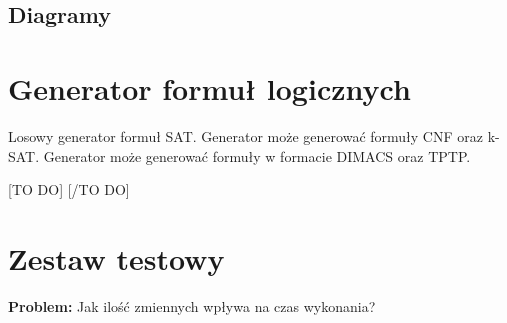 \documentclass[a4paper,12pt]{article}
\begin{document}
\begin{itemize}
\subsection{Diagramy}
%
%
%
%
%


\section{Generator formuł logicznych} \label{LFG}

Losowy generator formuł SAT. Generator może generować formuły \gls{CNF} oraz \gls{k-SAT}. Generator może generować formuły w formacie DIMACS oraz TPTP.

%


[TO DO]
[/TO DO]
\newpage
\section{Zestaw testowy}


\noindent
\textbf{Problem:} Jak ilość zmiennych wpływa na czas wykonania?


\end{itemize}
\end{document}
